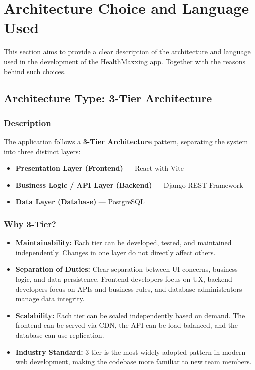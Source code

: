 \section{Architecture Choice and Language Used}
This section aims to provide a clear description of the architecture and language used in the development of the HealthMaxxing app. Together with the reasons behind such choices.
\subsection{Architecture Type: 3-Tier Architecture}
\subsubsection{Description}

The application follows a \textbf{3-Tier Architecture} pattern, separating the system into three distinct layers:

\begin{itemize}
  \item \textbf{Presentation Layer (Frontend)} --- React with Vite
  \item \textbf{Business Logic / API Layer (Backend)} --- Django REST Framework
  \item \textbf{Data Layer (Database)} --- PostgreSQL
\end{itemize}
\subsubsection{Why 3-Tier?}

\begin{itemize}
  \item \textbf{Maintainability:} Each tier can be developed, tested, and maintained independently. Changes in one layer do not directly affect others.
  \item \textbf{Separation of Duties:} Clear separation between UI concerns, business logic, and data persistence. Frontend developers focus on UX, backend developers focus on APIs and business rules, and database administrators manage data integrity.
  \item \textbf{Scalability:} Each tier can be scaled independently based on demand. The frontend can be served via CDN, the API can be load-balanced, and the database can use replication.
  \item \textbf{Industry Standard:} 3-tier is the most widely adopted pattern in modern web development, making the codebase more familiar to new team members.
\end{itemize}

